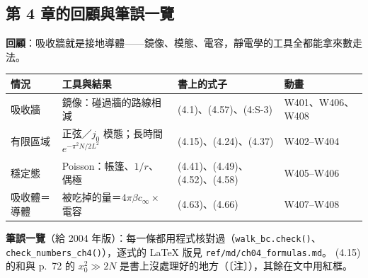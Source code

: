 \subsection{第 4 章的回顧與筆誤一覽}
\textbf{回顧}：吸收牆就是接地導體——鏡像、模態、電容，靜電學的工具全都能拿來數走法。
\begin{center}
\small\setlength{\tabcolsep}{4pt}
\begin{tabular}{@{}llll@{}}
\toprule
情況 & 工具與結果 & 書上的式子 & 動畫\\
\midrule
吸收牆 & 鏡像：碰過牆的路線相減 & (4.1)、(4.57)、(4:S-3) & W401、W406、W408\\
有限區域 & 正弦／$j_0$ 模態；長時間 $e^{-\pi^2N/2L^2}$ & (4.15)、(4.24)、(4.37) & W402--W404\\
穩定態 & Poisson：帳篷、$1/r$、偶極 & (4.41)、(4.49)、(4.52)、(4.58) & W405--W406\\
吸收體＝導體 & 被吃掉的量＝$4\pi\beta c_\infty\times$ 電容 & (4.63)、(4.66) & W407--W408\\
\bottomrule
\end{tabular}
\end{center}
\textbf{筆誤一覽}（給 2004 年版）：每一條都用程式核對過（\texttt{walk\_bc.check()}、\texttt{check\_numbers\_ch4()}），逐式的 LaTeX 版見 \texttt{ref/md/ch04\_formulas.md}。
(4.15) 的和與 p.~72 的 $x_0^2\gg2N$ 是書上沒處理好的地方（〔注〕），其餘在文中用紅框。
\begin{center}
\footnotesize
\FourTabErrata
\end{center}

